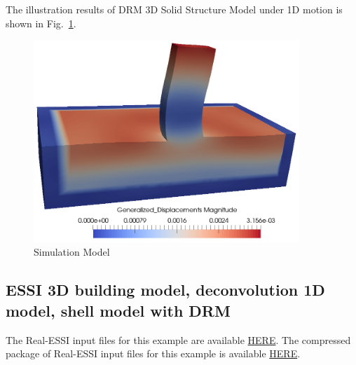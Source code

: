 The illustration results of DRM 3D Solid Structure Model  under 1D motion is shown 
in Fig.~\ref{fig_decon_1D_motion_3D_model_solid_structure}. 

\begin{figure}[H]
  \centering
  \includegraphics[width = 10cm]{./Figure-files/Day2/Deconvolution_1D_Motions/Earthquake_Soil-Structure_Interaction_3D_Model_with_DRM/DRM3D_results_1Dmotion.png}
  \caption{Simulation Model}
  \label{fig_decon_1D_motion_3D_model_solid_structure}
\end{figure}






\clearpage
\newpage
\subsection{ESSI 3D building model, deconvolution 1D model, shell model with DRM}
\label{Earthquake_Soil-Structure_Interaction_3D_Model_with_DRM2}

The Real-ESSI input files for this example are available 
\href{https://github.com/yuan-energy/Real-ESSI-Short-Course-Examples/tree/master/short-course-examples/Day2/Deconvolution_1D_Motions/Shell_Structure_Soil_Interaction_3D_DRM}{HERE}. 
The compressed package of Real-ESSI input files for this example is available 
\href{https://github.com/yuan-energy/Real-ESSI-Short-Course-Examples/blob/master/short-course-examples/Day2/Deconvolution_1D_Motions/Shell_Structure_Soil_Interaction_3D_DRM/Shell_Structure_Soil_Interaction_3D_DRM.tgz?raw=true}{HERE}. 

